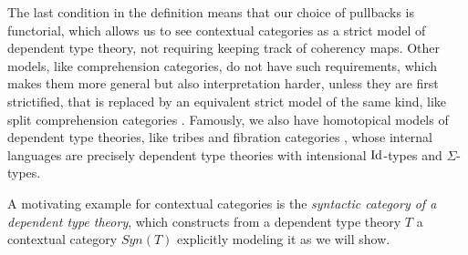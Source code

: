 \documentclass[a4paper,fontsize=12pt]{scrartcl}
\begin{document}
\begin{rmk}
  The last condition in the definition means that our choice of pullbacks is
  functorial, which allows us to see contextual categories as a strict model of
  dependent type theory, not requiring keeping track of coherency maps.
  Other models, like comprehension categories, do not
  have such requirements, which makes them more general but also
  interpretation harder, unless they are first strictified, that is replaced by
  an equivalent strict model of the same kind, like split comprehension
  categories . Famously, we also have
  homotopical models of dependent type
  theories, like tribes and fibration categories , whose
  internal languages are precisely dependent type theories with intensional
  $\operatorname{Id}$-types and $\Sigma$-types.
\end{rmk}

A motivating example for contextual categories is the \emph{syntactic category
of a dependent type theory}, which constructs from a dependent type theory $T$ a
contextual category $Syn(T)$ explicitly modeling it as we will show.
\end{document}
